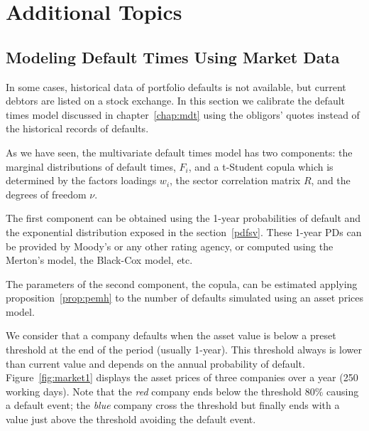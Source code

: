 \documentclass[11pt,fleqn]{book} %
\begin{document}
\chapter{Additional Topics}

\section{Modeling Default Times Using Market Data}

In some cases, historical data of portfolio defaults is not available, but 
current debtors are listed on a stock exchange. In this section we calibrate 
the default times model discussed in chapter~\ref{chap:mdt} using the obligors' 
quotes instead of the historical records of defaults.

As we have seen, the multivariate default times model has two components: the 
marginal distributions of default times, $F_i$, and a t-Student copula which is 
determined by the factors loadings $w_i$, the sector correlation matrix $R$, 
and the degrees of freedom $\nu$.

The first component can be obtained using the 1-year probabilities of default 
and the exponential distribution exposed in the section~\ref{pdfsv}. These 
1-year PDs can be provided by Moody's or any other rating agency, or computed 
using the Merton's model, the Black-Cox model, etc.

The parameters of the second component, the copula, can be estimated applying
proposition~\ref{prop:pemh} to the number of defaults simulated using an asset 
prices model.

We consider that a company defaults when the asset value is below a preset 
threshold at the end of the period (usually 1-year). This threshold always is 
lower than current value and depends on the annual probability of default. 
Figure~\ref{fig:market1} displays the asset prices of three companies over a 
year (250 working days). Note that the \emph{red} company ends below the 
threshold $80\%$ causing a default event; the \emph{blue} company cross the 
threshold but finally ends with a value just above the threshold avoiding
the default event.
\end{document}
